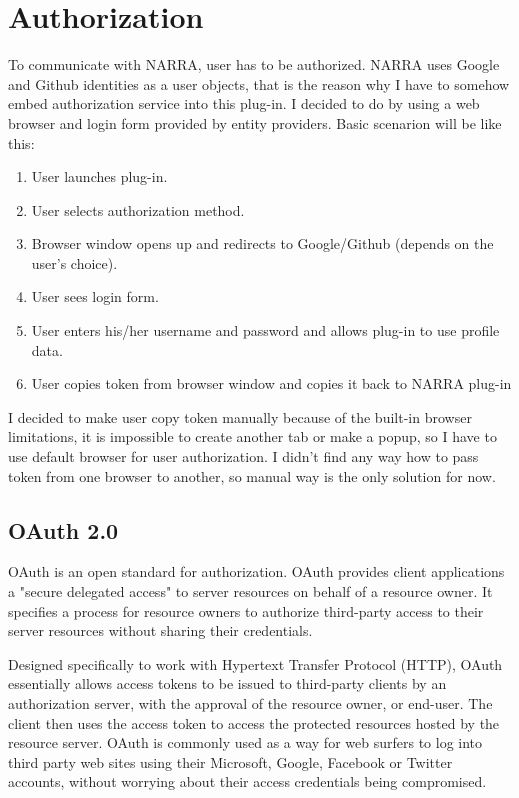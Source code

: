 \documentclass[thesis=B,english]{FITthesis}[2012/10/20]
\begin{document}
\section{Authorization}
To communicate with NARRA, user has to be authorized. NARRA uses Google and Github identities as a user objects, that is the reason why I have to somehow embed authorization service into this plug-in. I decided to do by using a web browser and login form provided by entity providers. Basic scenarion will be like this:
	\begin{enumerate}
		\item User launches plug-in.
		\item User selects authorization method.
		\item Browser window opens up and redirects to Google/Github (depends on the user's choice).
		\item User sees login form.
		\item User enters his/her username and password and allows plug-in to use profile data.
		\item User copies token from browser window and copies it back to NARRA plug-in
	\end{enumerate}
I decided to make user copy token manually because of the built-in browser limitations, it is impossible to create another tab or make a popup, so I have to use default browser for user authorization. I didn't find any way how to pass token from one browser to another, so manual way is the only solution for now.   
\subsection{OAuth 2.0}
OAuth is an open standard for authorization. OAuth provides client applications a "secure delegated access" to server resources on behalf of a resource owner. It specifies a process for resource owners to authorize third-party access to their server resources without sharing their credentials. 

Designed specifically to work with Hypertext Transfer Protocol (HTTP), OAuth essentially allows access tokens to be issued to third-party clients by an authorization server, with the approval of the resource owner, or end-user. The client then uses the access token to access the protected resources hosted by the resource server. OAuth is commonly used as a way for web surfers to log into third party web sites using their Microsoft, Google, Facebook or Twitter accounts, without worrying about their access credentials being compromised.\cite{oauth}
\end{document}
